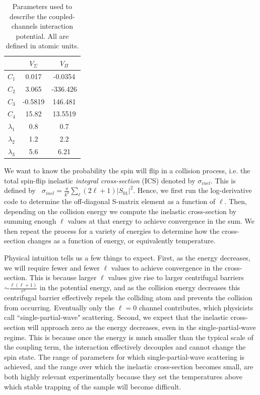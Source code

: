 \documentclass[%
 reprint,
 amsmath,amssymb,
 aps,
 nofootinbib
]{revtex4-1}
\begin{document}
\begin{table}
\begin{center}
 \begin{tabular}{|c c c|} 
 \hline
 & $V_\Sigma$  & $V_\Pi$  \\
\hline\hline 
$C_1$ & 0.017 & -0.0354 \\ 
$C_2$ & 3.065 & -336.426 \\
$C_3$ & -0.5819 & 146.481 \\
$C_4$ & 15.82 & 13.5519 \\
$\lambda_1$ & 0.8 & 0.7 \\
$\lambda_2$ & 1.2 & 2.2 \\
$\lambda_3$ & 5.6&  6.21 \\
 \hline
\end{tabular}
\caption{Parameters used to describe the coupled-channels interaction potential. All are defined in atomic units.}
\label{tab:QuantumCoeffs}
\end{center}
\end {table}

We want to know the probability the spin will flip in a collision process, i.e. the total spin-flip inelastic \textit{integral cross-section} (ICS) denoted by $\sigma_{inel}$. This is defined by~\cite{Krems2017,ColdChemBook,ColdMolsBook} $\sigma_{inel} = \frac{\pi}{k^2} \sum_{\ell} (2\ell+1) \lvert S_{01} \rvert^2$. Hence, we first run the log-derivative code to determine the off-diagonal S-matrix element as a function of $\ell$. Then, depending on the collision energy we compute the inelastic cross-section by summing enough $\ell$ values at that energy to achieve convergence in the sum. We then repeat the process for a variety of energies to determine how the cross-section changes as a function of energy, or equivalently temperature. 

Physical intuition tells us a few things to expect. First, as the energy decreases, we will require fewer and fewer $\ell$ values to achieve convergence in the cross-section. This is because larger $\ell$ values give rise to larger centrifugal barriers $\sim \frac{\ell(\ell+1)}{r^2}$ in the potential energy, and as the collision energy decreases this centrifugal barrier effectively repels the colliding atom and prevents the collision from occurring. Eventually only the $\ell=0$ channel contributes, which physicists call ``single-partial-wave" scattering. Second, we expect that the inelastic cross-section will approach zero as the energy decreases, even in the single-partial-wave regime. This is because once the energy is much smaller than the typical scale of the coupling term, the interaction effectively decouples and cannot change the spin state. The range of parameters for which single-partial-wave scattering is achieved, and the range over which the inelastic cross-section becomes small, are both highly relevant experimentally because they set the temperatures above which stable trapping of the sample will become difficult. 
\end{document}
